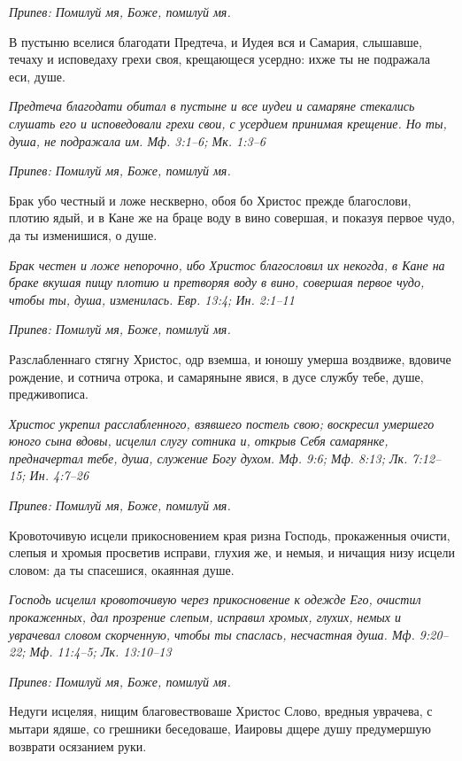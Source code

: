 \itshape Припев:\normalfont{} Помилуй мя, Боже, помилуй мя.


В пустыню вселися благодати Предтеча, и Иудея вся и Самария, слышавше, течаху и исповедаху грехи своя, крещающеся усердно: ихже ты не подражала еси, душе.


\itshape Предтеча благодати обитал в пустыне и все иудеи и самаряне стекались слушать его и исповедовали грехи свои, с усердием принимая крещение. Но ты, душа, не подражала им. Мф. 3:1–6; Мк. 1:3–6\normalfont{}


\itshape Припев:\normalfont{} Помилуй мя, Боже, помилуй мя.


Брак убо честный и ложе нескверно, обоя бо Христос прежде благослови, плотию ядый, и в Кане же на браце воду в вино совершая, и показуя первое чудо, да ты изменишися, о душе.


\itshape Брак честен и ложе непорочно, ибо Христос благословил их некогда, в Кане на браке вкушая пищу плотию и претворяя воду в вино, совершая первое чудо, чтобы ты, душа, изменилась. Евр. 13:4; Ин. 2:1–11\normalfont{}


\itshape Припев:\normalfont{} Помилуй мя, Боже, помилуй мя.


Разслабленнаго стягну Христос, одр вземша, и юношу умерша воздвиже, вдовиче рождение, и сотнича отрока, и самаряныне явися, в дусе службу тебе, душе, предживописа.


\itshape Христос укрепил расслабленного, взявшего постель свою; воскресил умершего юного сына вдовы, исцелил слугу сотника и, открыв Себя самарянке, предначертал тебе, душа, служение Богу духом. Мф. 9:6; Мф. 8:13; Лк. 7:12–15; Ин. 4:7–26\normalfont{}


\itshape Припев:\normalfont{} Помилуй мя, Боже, помилуй мя.


Кровоточивую исцели прикосновением края ризна Господь, прокаженныя очисти, слепыя и хромыя просветив исправи, глухия же, и немыя, и ничащия низу исцели словом: да ты спасешися, окаянная душе.


\itshape Господь исцелил кровоточивую через прикосновение к одежде Его, очистил прокаженных, дал прозрение слепым, исправил хромых, глухих, немых и уврачевал словом скорченную, чтобы ты спаслась, несчастная душа. Мф. 9:20–22; Мф. 11:4–5; Лк. 13:10–13\normalfont{}


\itshape Припев:\normalfont{} Помилуй мя, Боже, помилуй мя.


Недуги исцеляя, нищим благовествоваше Христос Слово, вредныя уврачева, с мытари ядяше, со грешники беседоваше, Иаировы дщере душу предумершую возврати осязанием руки.


